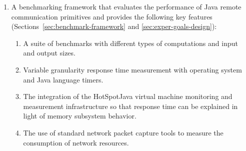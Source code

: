 \documentclass{sig-alternate}
\begin{document}


\begin{enumerate}

\setlength{\itemsep}{0in}
 \setlength{\topsep}{0in}
 \setlength{\partopsep}{0in}

\item A benchmarking framework that evaluates the performance of Java
  remote communication primitives and provides the following key
  features (Sections~\ref{sec:benchmark-framework} and
  \ref{sec:exper-goals-design}):

\begin{enumerate}

\setlength{\itemsep}{0in}
 \setlength{\topsep}{0in}
 \setlength{\partopsep}{0in}


\item A suite of benchmarks with different types of computations and
  input and output sizes.

\item Variable granularity response time measurement with operating
  system and Java language timers.

\item The integration of the HotSpot\texttrademark Java virtual
  machine monitoring and measurement infrastructure
  \cite{armstrong-hotspot} so that response time can be explained in
  light of memory subsystem behavior.

\item The use of standard network packet capture tools to measure the
  consumption of network resources.



\end{enumerate}
\end{enumerate}
\end{document}
